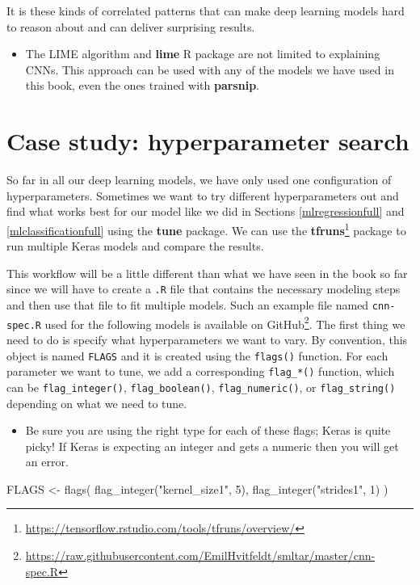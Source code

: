 \documentclass[
]{krantz}
\makeatletter
\newenvironment{Shaded}{\begin{snugshade}}{\end{snugshade}}
\newcommand{\DecValTok}[1]{\textcolor[rgb]{0.00,0.00,0.81}{#1}}
\newcommand{\FunctionTok}[1]{\textcolor[rgb]{0.00,0.00,0.00}{#1}}
\newcommand{\NormalTok}[1]{#1}
\newcommand{\OtherTok}[1]{\textcolor[rgb]{0.56,0.35,0.01}{#1}}
\newcommand{\StringTok}[1]{\textcolor[rgb]{0.31,0.60,0.02}{#1}}
\DeclareRobustCommand{\href}[2]{#2\footnote{\url{#1}}}
\renewcommand{\href}[2]{#2\footnote{\url{#1}}}
\newenvironment{kframe}{%
\medskip{}
\setlength{\fboxsep}{.8em}
 \def\at@end@of@kframe{}%
 \ifinner\ifhmode%
  \def\at@end@of@kframe{\end{minipage}}%
  \begin{minipage}{\columnwidth}%
 \fi\fi%
 \def\FrameCommand##1{\hskip\@totalleftmargin \hskip-\fboxsep
 \colorbox{shadecolor}{##1}\hskip-\fboxsep
     \hskip-\linewidth \hskip-\@totalleftmargin \hskip\columnwidth}%
 \MakeFramed {\advance\hsize-\width
   \@totalleftmargin\z@ \linewidth\hsize
   \@setminipage}}%
 {\par\unskip\endMakeFramed%
 \at@end@of@kframe}
\renewenvironment{Shaded}{\begin{kframe}}{\end{kframe}}
\newenvironment{rmdblock}[1]
  {\begin{shaded*}
  \begin{itemize}[left = -1cm, labelsep = 1cm]
  \renewcommand{\labelitemi}{
    \raisebox{-.7\height}[0pt][0pt]{
      {\setkeys{Gin}{width=3em,keepaspectratio}\texttt{[image: images/\#1]}}
    }
  }
 
  \item
  }
  {
  \end{itemize}
  \end{shaded*}
  }
\newenvironment{rmdnote}
  {\begin{rmdblock}{note}}
  {\end{rmdblock}}
\newenvironment{rmdwarning}
  {\begin{rmdblock}{warning}}
  {\end{rmdblock}}
\makeatother
\begin{document}
It is these kinds of correlated patterns that can make deep learning models hard to reason about and can deliver surprising results.

\begin{rmdnote}
The LIME algorithm and \textbf{lime} R package are not limited to
explaining CNNs. This approach can be used with any of the models we
have used in this book, even the ones trained with \textbf{parsnip}.
\end{rmdnote}

\hypertarget{keras-hyperparameter}{%
\section{Case study: hyperparameter search}\label{keras-hyperparameter}}

So far in all our deep learning models, we have only used one configuration of hyperparameters. Sometimes we want to try different hyperparameters out and find what works best for our model like we did in Sections \ref{mlregressionfull} and \ref{mlclassificationfull} using the \textbf{tune} package. We can use the \href{https://tensorflow.rstudio.com/tools/tfruns/overview/}{\textbf{tfruns}} package to run multiple Keras models and compare the results.

This workflow will be a little different than what we have seen in the book so far since we will have to create a \texttt{.R} file that contains the necessary modeling steps and then use that file to fit multiple models. Such an example file named \texttt{cnn-spec.R} used for the following models is available \href{https://raw.githubusercontent.com/EmilHvitfeldt/smltar/master/cnn-spec.R}{on GitHub}. The first thing we need to do is specify what hyperparameters we want to vary. By convention, this object is named \texttt{FLAGS} and it is created using the \texttt{flags()} function. For each parameter we want to tune, we add a corresponding \texttt{flag\_*()} function, which can be \texttt{flag\_integer()}, \texttt{flag\_boolean()}, \texttt{flag\_numeric()}, or \texttt{flag\_string()} depending on what we need to tune.

\begin{rmdwarning}
Be sure you are using the right type for each of these flags; Keras is
quite picky! If Keras is expecting an integer and gets a numeric then
you will get an error.
\end{rmdwarning}

\begin{Shaded}
\begin{Highlighting}[]
\NormalTok{FLAGS }\OtherTok{\textless{}{-}} \FunctionTok{flags}\NormalTok{(}
  \FunctionTok{flag\_integer}\NormalTok{(}\StringTok{"kernel\_size1"}\NormalTok{, }\DecValTok{5}\NormalTok{),}
  \FunctionTok{flag\_integer}\NormalTok{(}\StringTok{"strides1"}\NormalTok{, }\DecValTok{1}\NormalTok{)}
\NormalTok{)}
\end{Highlighting}
\end{Shaded}
\end{document}

